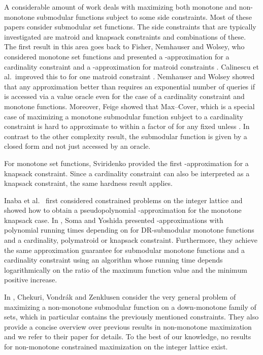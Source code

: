 \documentclass{article}
\theoremstyle{plain}
\theoremstyle{definition}
\begin{document}
A considerable amount of work deals with maximizing both monotone and non-monotone submodular functions subject to some side constraints. 
Most of these papers consider submodular set functions. The side constraints that are typically investigated are matroid and knapsack constraints 
and combinations of these. 
The first result in this area goes back to Fisher, Nemhauser and Wolsey, who considered monotone set functions and 
presented a -approximation for a cardinality constraint \cite{FisherGreedyI} 
and a -approximation for  matroid constraints \cite{FisherGreedyII}. 
Calinescu et al.\ improved this to  for one matroid constraint \cite{MonotoneMatroid1}. 
Nemhauser and Wolsey \cite{NemhauserHardnessSM} showed that any 
approximation better than  requires an exponential number of queries if  is accessed via a value oracle even for the case of a
cardinality constraint and monotone functions. 
Moreover, Feige showed that Max--Cover, which is a special case of maximizing a monotone submodular function subject to a cardinality constraint is hard
to approximate to within a factor of  for any fixed  unless . In contrast to the other complexity result, 
the submodular function is given by a closed form and not just accessed by an oracle.   


For monotone set functions, Sviridenko \cite{SviridenkoKnapsack} provided the first -approximation for a knapsack constraint. 
Since a cardinality constraint can also be interpreted as a knapsack constraint, the same hardness result applies.  

Inaba et al.\ \cite{Inaba:KnapsackIL} first considered constrained problems on the integer lattice and 
showed how to obtain a pseudopolynomial -approximation for the monotone knapsack case.
In \cite{SomaYoshi16}, Soma and Yoshida presented -approximations with 
polynomial running times depending on  for DR-submodular monotone functions and a cardinality, polymatroid or knapsack constraint.
Furthermore, they achieve the same approximation guarantee 
for submodular monotone functions and a cardinality constraint using an algorithm whose running time depends 
logarithmically on the ratio of the maximum function value and the minimum positive increase. 



In \cite{ContentionResolution}, Chekuri, Vondr\'ak and Zenklusen consider the very general problem 
of maximizing  a non-monotone submodular function on a down-monotone family of sets, 
which in particular contains the previously mentioned constraints. 
They also provide a concise overview over previous results in non-monotone maximization and we refer to
their paper for details. 
To the best of our knowledge, no results for non-monotone constrained maximization on the integer lattice exist. 
\end{document}
